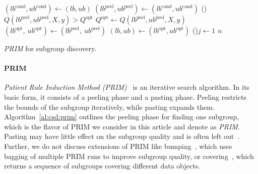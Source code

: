 \documentclass{article}
\theoremstyle{definition}
\begin{document}
\begin{algorithm}[p]
{{{				$(\mathit{lb}^{\text{cand}}, \mathit{ub}^{\text{cand}}) \leftarrow (\mathit{lb}, \mathit{ub})$\; \label{al:csd:prim:line:peel-end}
			}
		}
		$(\mathit{lb}^{\text{peel}}, \mathit{ub}^{\text{peel}}) \leftarrow (\mathit{lb}^{\text{cand}}, \mathit{ub}^{\text{cand}})$  \label{al:csd:prim:line:best-peel-selection}
		\If(){$Q(\mathit{lb}^{\text{peel}}, \mathit{ub}^{\text{peel}}, X, y) > Q^{\text{opt}}$}{ \label{al:csd:prim:line:opt-check-start}
			$Q^{\text{opt}} \leftarrow Q(\mathit{lb}^{\text{peel}}, \mathit{ub}^{\text{peel}}, X, y)$\;
			$(\mathit{lb}^{\text{opt}},~ \mathit{ub}^{\text{opt}}) \leftarrow (\mathit{lb}^{\text{peel}},~ \mathit{ub}^{\text{peel}})$\; \label{al:csd:prim:line:opt-check-end} \label{al:csd:prim:iteration-end}
		}
	}
	$(\mathit{lb}, \mathit{ub}) \leftarrow (\mathit{lb}^{\text{opt}}, \mathit{ub}^{\text{opt}})$\; \label{al:csd:prim:line:select-optimal-bounds}
	\For(){$j \leftarrow 1$ \KwTo $n$}{ \label{al:csd:prim:line:bounds-infty-start}
		 \label{al:csd:prim:line:bounds-infty-end}
	}
	\caption{\emph{PRIM} for subgroup discovery.}
	\label{al:csd:prim}
\end{algorithm}

\paragraph{PRIM}

\emph{Patient Rule Induction Method (PRIM)}~\cite{friedman1999bump} is an iterative search algorithm.
In its basic form, it consists of a peeling phase and a pasting phase.
Peeling restricts the bounds of the subgroup iteratively, while pasting expands them.
Algorithm~\ref{al:csd:prim} outlines the peeling phase for finding one subgroup, which is the flavor of PRIM we consider in this article and denote as \emph{PRIM}.
Pasting may have little effect on the subgroup quality and is often left out~\cite{arzamasov2021reds}.
Further, we do not discuss extensions of PRIM like bumping~\cite{friedman1999bump, kwakkel2016improving}, which uses bagging of multiple PRIM runs to improve subgroup quality, or covering~\cite{friedman1999bump}, which returns a sequence of subgroups covering different data objects.
\end{document}
